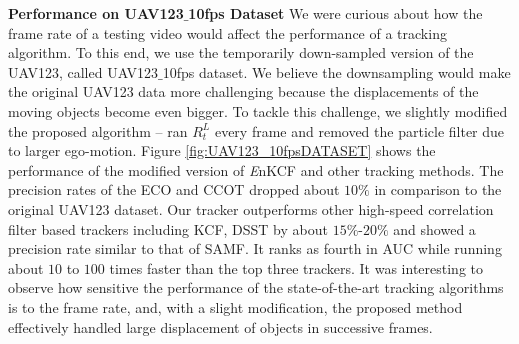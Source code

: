 \documentclass[10pt,twocolumn,letterpaper]{article}
\begin{document}
\textbf{Performance on UAV123$\_$10fps Dataset} We were curious about
how the frame rate of a testing video would affect the performance of
a tracking algorithm. To this end, we use the temporarily down-sampled
version of the UAV123, called UAV123$\_$10fps dataset. We believe the
downsampling would make the original UAV123 data more challenging
because the displacements of the moving objects become even bigger. To
tackle this challenge, we slightly modified the proposed algorithm --
ran $R_{t}^{L}$ every frame and removed the particle filter due to
larger ego-motion. Figure \ref{fig:UAV123_10fpsDATASET} shows the
performance of the modified version of {\it E}nKCF and other tracking
methods. The precision rates of the ECO and CCOT dropped about $10\%$
in comparison to the original UAV123 dataset. Our tracker outperforms
other high-speed correlation filter based trackers including KCF, DSST
by about $15\%$-$20\%$ and showed a precision rate similar to that of
SAMF. It ranks as fourth in AUC while running about $10$ to $100$
times faster than the top three trackers. It was interesting to
observe how sensitive the performance of the state-of-the-art tracking
algorithms is to the frame rate, and, with a slight modification, the
proposed method effectively handled large displacement of objects in
successive frames.

\end{document}
